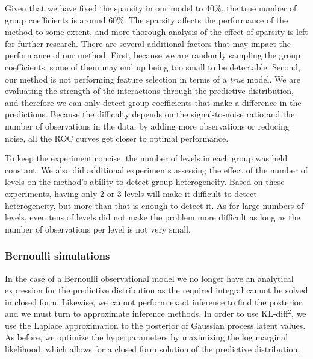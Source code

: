 \documentclass{article}
\begin{document}
%
%

%
%
%



%
%
%
%
%
%
%

%
%
%
Given that we have fixed the sparsity in our model to $40\%$, the true number of group coefficients is around $60\%$.
The sparsity affects the performance of the method to some extent, and more thorough analysis of the effect of sparsity is left for further research.
There are several additional factors that may impact the performance of our method.
First, because we are randomly sampling the group coefficients, some of them may end up being too small to be detectable.
Second, our method is not performing feature selection in terms of a \emph{true} model. 
We are evaluating the strength of the interactions through the predictive distribution, and therefore we can only detect group coefficients that make a difference in the predictions.
%
%
Because the difficulty depends on the signal-to-noise ratio and the number of observations in the data,
by adding more observations or reducing noise, all the ROC curves get closer to optimal performance.

To keep the experiment concise, the number of levels in each group was held constant. We also did
additional experiments assessing the effect of the number of levels on the method's ability
to detect group heterogeneity. Based on these experiments, having only 2 or 3 levels will make
it difficult to detect heterogeneity, but more than that is enough to detect it.
As for large numbers of levels, even tens of levels did not make the problem more difficult
as long as the number of observations per level is not very small.

\subsubsection{Bernoulli simulations}

In the case of a Bernoulli observational model we no longer have an analytical expression for the predictive distribution as the required integral cannot be solved in closed form.
Likewise, we cannot perform exact inference to find the posterior, and we must turn to approximate inference methods.
In order to use KL-diff$^2$, we use the Laplace approximation to the posterior of Gaussian process latent values.
As before, we optimize the hyperparameters by maximizing the log marginal likelihood, which allows for a closed form solution of the predictive distribution.
\end{document}
